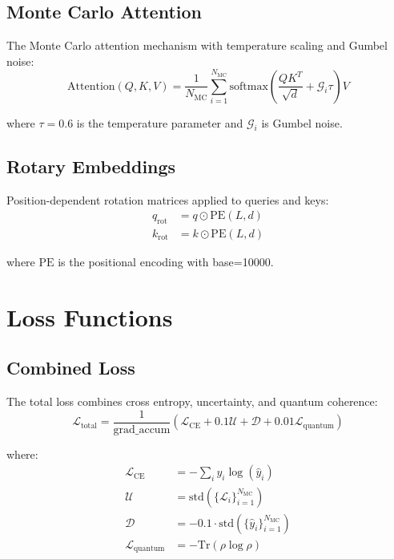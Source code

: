 \documentclass{article}
\begin{document}
\subsection{Monte Carlo Attention}
The Monte Carlo attention mechanism with temperature scaling and Gumbel noise:
\begin{equation}
\text{Attention}(Q,K,V) = \frac{1}{N_{\text{MC}}}\sum_{i=1}^{N_{\text{MC}}} \text{softmax}\left(\frac{QK^T}{\sqrt{d}} + \mathcal{G}_i\tau\right)V
\end{equation}

where $\tau=0.6$ is the temperature parameter and $\mathcal{G}_i$ is Gumbel noise.

\subsection{Rotary Embeddings}
Position-dependent rotation matrices applied to queries and keys:
\begin{equation}
\begin{split}
q_{\text{rot}} &= q \odot \text{PE}(L,d) \\
k_{\text{rot}} &= k \odot \text{PE}(L,d)
\end{split}
\end{equation}

where $\text{PE}$ is the positional encoding with base=10000.

\section{Loss Functions}

\subsection{Combined Loss}
The total loss combines cross entropy, uncertainty, and quantum coherence:
\begin{equation}
\mathcal{L}_{\text{total}} = \frac{1}{\text{grad\_accum}}\left(\mathcal{L}_{\text{CE}} + 0.1\mathcal{U} + \mathcal{D} + 0.01\mathcal{L}_{\text{quantum}}\right)
\end{equation}

where:
\begin{align*}
\mathcal{L}_{\text{CE}} &= -\sum_{i} y_i \log(\hat{y}_i) \\
\mathcal{U} &= \text{std}(\{\mathcal{L}_i\}_{i=1}^{N_{\text{MC}}}) \\
\mathcal{D} &= -0.1 \cdot \text{std}(\{\hat{y}_i\}_{i=1}^{N_{\text{MC}}}) \\
\mathcal{L}_{\text{quantum}} &= -\text{Tr}(\rho\log\rho)
\end{align*}
\end{document}
